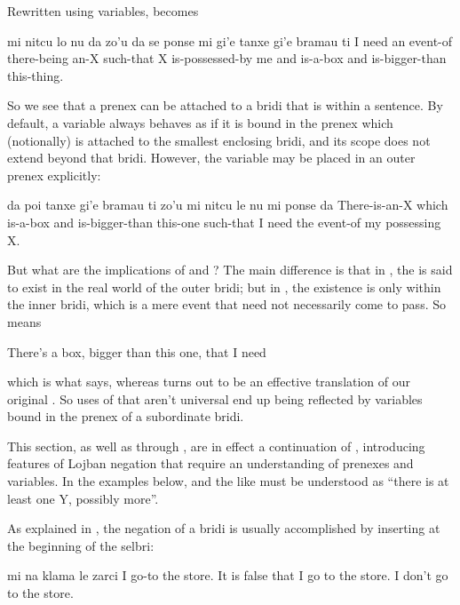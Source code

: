 Rewritten using variables, 
    becomes
\begin{example}
mi nitcu lo nu da zo'u\n
\T	da se ponse mi gi'e tanxe\n
\T	gi'e bramau ti\n
I need an event-of there-being an-X such-that\n
\T	X is-possessed-by me and is-a-box\n
\T	and is-bigger-than this-thing.
\end{example}

So we see that a prenex can be attached to a bridi that is
    within a sentence. By default, a variable always behaves as if
    it is bound in the prenex which (notionally) is attached to the
    smallest enclosing bridi, and its scope does not extend beyond
    that bridi. However, the variable may be placed in an outer
    prenex explicitly:
\begin{example}
da poi tanxe\n
\T	gi'e bramau ti zo'u\n
\T	mi nitcu le nu mi ponse da\n
There-is-an-X which is-a-box\n
\T	and is-bigger-than this-one such-that\n
\T	I need the event-of my possessing X.
\end{example}

But what are the implications of  and ? The main
    difference is that in , the
     is said to exist in the real world of the outer bridi;
    but in , the existence is only
    within the inner bridi, which is a mere event that need not
    necessarily come to pass. So 
    means
\begin{example}
There's a box, bigger than this one, that I need
\end{example}

{\noindent}which is what  says, whereas  turns out to be an effective
    translation of our original . So
    uses of  that aren't universal end up being reflected by
    variables bound in the prenex of a subordinate bridi.



This section, as well as 
    through , are in effect a
    continuation of ,
    introducing features of Lojban negation that require an
    understanding of prenexes and variables. In the examples below,
     and the like must be understood as ``there is
    at least one Y, possibly more''.

As explained in , the
    negation of a bridi is usually accomplished by inserting 
    at the beginning of the selbri:
\begin{example}
mi na klama le zarci\n
I  go-to the store.\n
It is false that I go to the store.\n
I don't go to the store.
\end{example}

